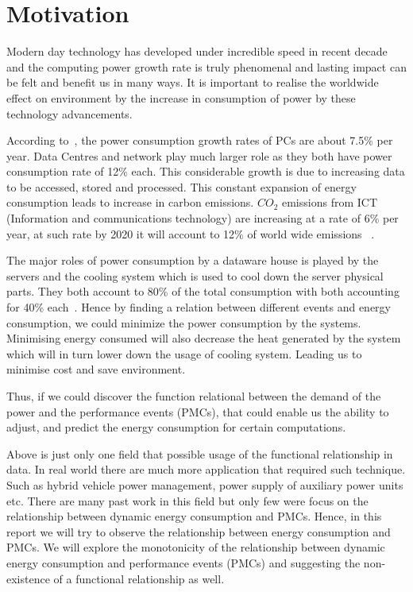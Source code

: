 \section{Motivation}
Modern day technology has developed under incredible speed in recent decade and the computing power growth rate is truly phenomenal and lasting impact can be felt and benefit us in many ways. It is important to realise the worldwide effect on environment by the increase in consumption of power by these technology advancements.

According to~\cite{pickavet2008worldwide}, the power consumption growth rates of PCs are about 7.5\% per year. Data Centres and network play much larger role as they both have power consumption rate of 12\% each. This considerable growth is due to increasing data to be accessed, stored and processed. This constant expansion of energy consumption leads to increase in carbon emissions. \(CO_2\) emissions from ICT (Information and communications technology) are increasing at a rate of 6\% per year, at such rate by 2020 it will account to 12\% of world wide emissions ~\cite{rong2016optimizing}.

The major roles of power consumption by a dataware house is played by the servers and the cooling system which is used to cool down the server physical parts. They both account to 80\% of the total consumption with both accounting for 40\% each~\cite{rong2016optimizing}. Hence by finding a relation between different events and energy consumption, we could minimize the power consumption by the systems. Minimising energy consumed will also decrease the heat generated by the system which will in turn lower down the usage of cooling system. Leading us to minimise cost and save environment.

Thus, if we could discover the function relational between the demand of the power and the performance events (PMCs), that could enable us the ability to adjust, and predict the energy consumption for certain computations.

Above is just only one field that possible usage of the functional relationship in data. In real world there are much more application that required such technique. Such as hybrid vehicle power management, power supply of auxiliary power units etc. There are many past work in this field but only few were focus on the relationship between dynamic energy consumption and PMCs. Hence, in this report we will try to observe the relationship between energy consumption and PMCs. We will explore the monotonicity of the relationship between dynamic energy consumption and performance events (PMCs) and suggesting the non-existence of a functional relationship as well.

